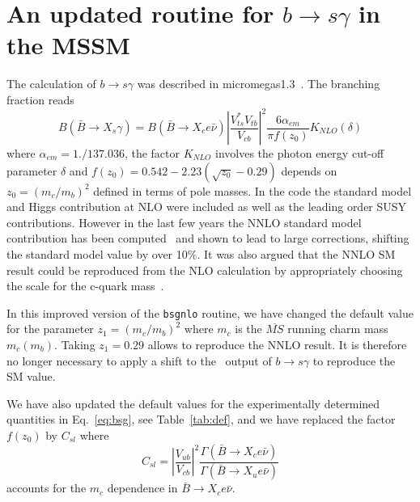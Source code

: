 \documentclass[12pt,a4paper]{article}
\begin{document}
\appendix
\section{An updated routine for $b\rightarrow s\gamma$ in the MSSM}
The calculation of $b\rightarrow s\gamma$ was described in micromegas1.3~\cite{Belanger:2004yn}. 
The branching fraction reads
\begin{equation}
B(\bar{B}\rightarrow X_s \gamma) =B(\bar{B}\rightarrow X_c e\bar\nu) \left|\frac{V_{ts}^* V_{tb}}
{V_{cb}}\right|^2 \frac{6\alpha_{em}}{\pi f(z_0)} K_{NLO}(\delta)
\label{eq:bsg}
\end{equation}
where $\alpha_{em}=1./137.036$, the factor $K_{NLO}$ involves the photon energy cut-off parameter
$\delta$ and $f(z_0)=0.542-2.23(\sqrt{z_0} -0.29)$ depends on $z_0=(m_c/m_b)^2$ defined in terms of pole
masses.  
In the code 
the standard model and Higgs contribution at NLO were included as well as the leading order SUSY
contributions. However in the last few years
 the NNLO standard model contribution has been computed~\cite{Misiak:2006zs} and shown to lead to large corrections, shifting
 the standard model value by over 10\%. 
 It was also argued that the NNLO SM result could be reproduced from
 the NLO calculation by appropriately choosing the scale for the c-quark mass~\cite{Misiak:2006ab,Gambino:2008fj}. 



 In this improved version of the {\tt bsgnlo} routine, we 
 have changed the default value for the parameter $z_1=(m_c/m_b)^2$
 where $m_c$ is the $\overline{MS}$ running charm mass $m_c(m_b)$. Taking $z_1=0.29$ allows 
 to reproduce the NNLO result. 
 It is therefore no longer necessary to apply a shift to  the \micro\ output of $b\rightarrow s\gamma$
 to reproduce the SM value. 


We have also updated the default values for the experimentally determined quantities in
Eq.~\ref{eq:bsg}, see Table~\ref{tab:def}, and we have replaced the factor $f(z_0)$ by $C_{sl}$ where
\begin{equation}
C_{sl}=\left|\frac{V_{ub}}{V_{cb}}\right|^2 \frac{\Gamma(\bar{B}\rightarrow X_c e\bar\nu)}{\Gamma(\bar{B}\rightarrow X_u e\bar\nu)}
\end{equation}
accounts for the $m_c$ dependence in $\bar{B}\rightarrow X_c e\bar\nu$.
\end{document}
